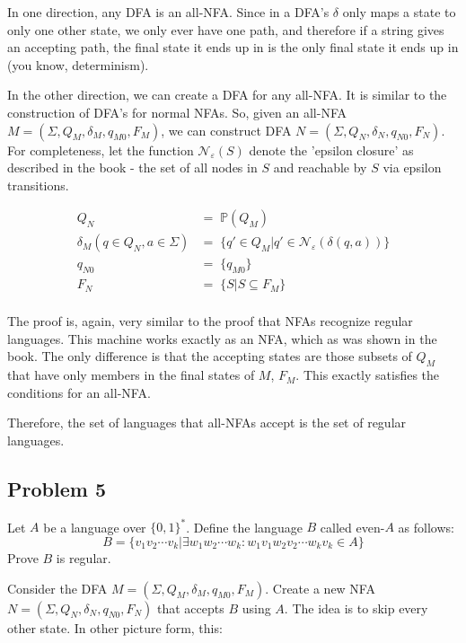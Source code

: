 \documentclass[english]{article}
\begin{document}
In one direction, any DFA is an all-NFA. Since in a DFA's $\delta$ only maps a state to only one other state, we only ever have one path, and therefore if a string gives an accepting path, the final state it ends up in is the only final state it ends up in (you know, determinism).

In the other direction, we can create a DFA for any all-NFA. It is similar to the construction of DFA's for normal NFAs. So, given an all-NFA $M = (\Sigma,Q_M,\delta_M,q_{M0},F_M)$, we can construct DFA $N = (\Sigma,Q_N,\delta_N,q_{N0},F_N)$. For completeness, let the function $\mathcal{N}_\varepsilon(S)$ denote the 'epsilon closure' as described in the book - the set of all nodes in $S$ and reachable by $S$ via epsilon transitions.

\begin{align*}
                              Q_N &=\; \mathbb{P}(Q_M) \\
 \delta_M(q \in Q_N,a \in \Sigma) &=\; \{ q' \in Q_M | q' \in \mathcal{N}_\varepsilon(\delta(q,a)) \} \\
                           q_{N0} &=\; \{q_{M0}\} \\
                              F_N &=\; \{ S | S \subseteq F_M \} \\
\end{align*}

The proof is, again, very similar to the proof that NFAs recognize regular languages. This machine works exactly as an NFA, which as was shown in the book. The only difference is that the accepting states are those subsets of $Q_M$ that have only members in the final states of $M$, $F_M$. This exactly satisfies the conditions for an all-NFA.

Therefore, the set of languages that all-NFAs accept is the set of regular languages.

\subsection*{Problem 5}
Let $A$ be a language over $\{0,1\}^*$. Define the language $B$ called even-$A$ as follows:
\[ B = \{ v_1 v_2 \cdots v_k | \exists w_1 w_2 \cdots w_k : w_1 v_1 w_2 v_2 \cdots w_k v_k \in A \} \]
Prove $B$ is regular.

Consider the DFA $M = (\Sigma,Q_M,\delta_M,q_{M0},F_M)$. Create a new NFA $N = (\Sigma,Q_N,\delta_N,q_{N0},F_N)$ that accepts $B$ using $A$. The idea is to skip every other state. In other picture form, this:

\end{document}
